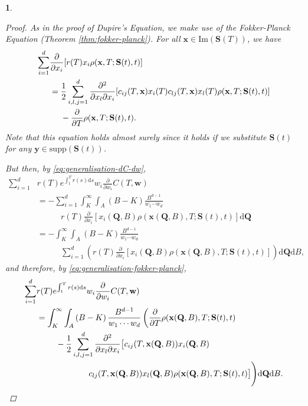 \documentclass[english]{article}
\numberwithin{equation}{section}
\numberwithin{figure}{section}
\theoremstyle{bolddescit}
\newtheorem{theorem}{\protect\theoremname}[section]
\theoremstyle{definition}
\theoremstyle{definition}
\theoremstyle{plain}
\theoremstyle{plain}
\theoremstyle{bolddesc}
\theoremstyle{plain}
\theoremstyle{remark}
\providecommand{\theoremname}{Theorem}
\begin{document}
\begin{theorem}
\begin{proof}
    As in the proof of Dupire's Equation, we make use of the Fokker-Planck Equation (Theorem \ref{thm:fokker-planck}). For all $\mathbf{x} \in \mathrm{Im}(\mathbf{S}(T))$, we have
    \begin{align}
      \sum_{i=1}^d &\frac{\partial}{\partial x_i}[r(T) x_i \rho(\mathbf{x},T;\mathbf{S}(t),t)]\notag\\
        &= \frac{1}{2} \sum_{i,l,j=1}^{d} \frac{\partial^2}{\partial x_l \partial x_i}[c_{ij}(T,\mathbf{x}) x_i(T) c_{lj}(T,\mathbf{x}) x_l(T) \rho(\mathbf{x},T;\mathbf{S}(t),t)]\notag\\
        &\ \ \ \ -\frac{\partial}{\partial T}\rho(\mathbf{x},T;\mathbf{S}(t),t).\label{eq:generalisation-fokker-planck}
    \end{align}
    Note that this equation holds almost surely since it holds if we substitute $\mathbf{S}(t)$ for any $\mathbf{y} \in \mathrm{supp}(\mathbf{S}(t))$.

    But then, by \eqref{eq:generalisation-dC-dw},
    \begin{align*}
      \sum_{i=1}^{d} &r(T) e^{\int_t^T r(s) \mathrm{d}s} w_i \frac{\partial}{\partial w_i} C(T,\mathbf{w})\\
      &= - \sum_{i=1}^{d} \int_K^\infty \int_A \left(B - K\right) \frac{B^{d-1}}{w_1 \cdots w_d}\\
         &\ \ \ \ \ \ \ \ \ \ \ \ \  r(T)\frac{\partial}{\partial x_i}\left[x_i(\mathbf{Q},B) \rho(\mathbf{x}(\mathbf{Q},B),T;\mathbf{S}(t),t) \right] \mathrm{d}\mathbf{Q} \\
      &= - \int_K^\infty \int_A \left(B - K\right) \frac{B^{d-1}}{w_1 \cdots w_d}\\
         &\ \ \ \ \ \ \ \ \ \ \ \ \ \sum_{i=1}^{d} \left( r(T)\frac{\partial}{\partial x_i}\left[x_i(\mathbf{Q},B) \rho(\mathbf{x}(\mathbf{Q},B),T;\mathbf{S}(t),t) \right] \right) \mathrm{d}\mathbf{Q} \mathrm{d}B,
    \end{align*}
    and therefore, by \eqref{eq:generalisation-fokker-planck},
    \begin{align}
      \sum_{i=1}^{d} &r(T) e^{\int_t^T r(s) \mathrm{d}s} w_i \frac{\partial}{\partial w_i} C(T,\mathbf{w})\notag\\
      &= \int_K^\infty \int_A \left(B - K\right) \frac{B^{d-1}}{w_1 \cdots w_d}
        \left( \frac{\partial}{\partial T}\rho(\mathbf{x}(\mathbf{Q},B),T;\mathbf{S}(t),t)\right.\notag\\
        &\ \ \ \ \ \ \ - \frac{1}{2} \sum_{i,l,j=1}^{d} \frac{\partial^2}{\partial x_l \partial x_i}\big[c_{ij}(T,\mathbf{x}(\mathbf{Q},B)) x_i(\mathbf{Q},B) \notag\\
        &\ \ \ \ \ \ \ \ \ \ \ \ \ \ \ \ \ \ \ c_{lj}(T,\mathbf{x}(\mathbf{Q},B)) x_l(\mathbf{Q},B) \rho(\mathbf{x}(\mathbf{Q},B),T;\mathbf{S}(t),t)\big] \Bigg) \mathrm{d}\mathbf{Q} \mathrm{d}B. \label{eq:generalisation-one-deriv}
    \end{align}


\end{proof}
\end{theorem}
\end{document}
